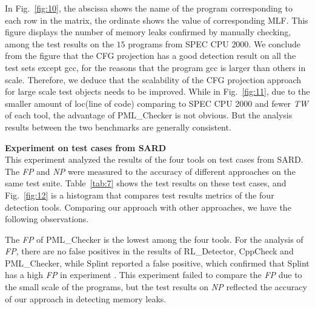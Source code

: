 In Fig.~\ref{fig:10}, the abscissa shows the name of the program corresponding to each row in the matrix, the ordinate shows the value of corresponding MLF. This figure displays the number of memory leaks confirmed by manually checking, among the test results on the $15$ programs from SPEC CPU $2000$. We conclude from the figure that the CFG projection has a good detection result on all the test sets except gcc, for the reasons that the program gcc is larger than others in scale. Therefore, we deduce that the scalability of the CFG projection approach for large scale test objects needs to be improved. While in Fig.~\ref{fig:11}, due to the smaller amount of loc(line of code) comparing to SPEC CPU 2000 and fewer \textit{TW} of each tool, the advantage of PML\_Checker is not obvious. But the analysis results between the two benchmarks are generally consistent.


\noindent\textbf{Experiment on test cases from SARD} 
\\
This experiment analyzed the results of the four tools on test cases from SARD. The \textit{FP} and \textit{NP} were measured to the accuracy of different approaches on the same test suite. Table~\ref{tab:7} shows the test results on these test cases, and Fig.~\ref{fig:12} is a histogram that compares test results metrics of the four detection tools. Comparing our approach with other approaches, we have the following observations.


The \textit{FP} of PML\_Checker is the lowest among the four tools. For the analysis of \textit{FP}, there are no false positives in the results of RL\_Detector, CppCheck and PML\_Checker, while Splint reported a false positive, which confirmed that Splint has a high \textit{FP} in experiment . This experiment failed to compare the \textit{FP} due to the small scale of the programs, but the test results on \textit{NP} reflected the accuracy of our approach in detecting memory leaks.

